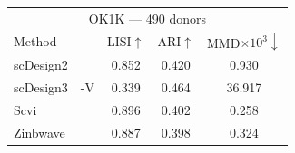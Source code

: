 \begin{tabular}{llccc}
\toprule
\multicolumn{5}{c}{OK1K — 490 donors} \\
Method & & LISI$\uparrow$ & ARI$\uparrow$ & MMD$\times 10^3\downarrow$ \\
\midrule
scDesign2 &  & 0.852 & 0.420 & 0.930 \\
scDesign3 & -V & 0.339 & 0.464 & 36.917 \\
\addlinespace[2pt]
Scvi &  & 0.896 & 0.402 & 0.258 \\
\addlinespace[2pt]
Zinbwave &  & 0.887 & 0.398 & 0.324 \\
\bottomrule
\end{tabular}

